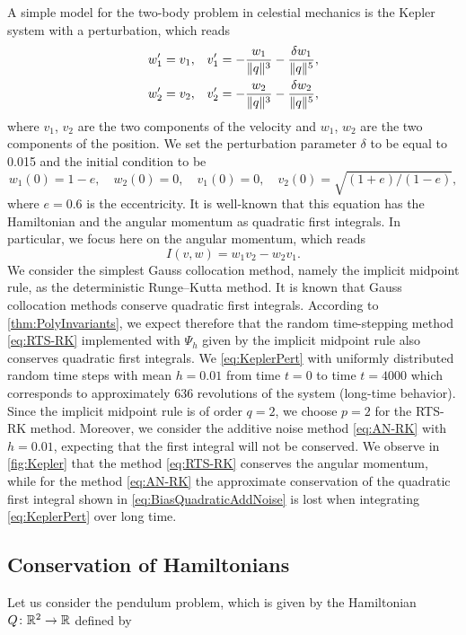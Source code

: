 \documentclass[10pt]{article}
\begin{document}
A simple model for the two-body problem in celestial mechanics is the Kepler system with a perturbation, which reads
\begin{equation}\label{eq:KeplerPert}
\begin{aligned}
	w_1' &= v_1, && v_1' = -\frac{w_1}{\lVert q\rVert^3} - \frac{\delta w_1}{\lVert q\rVert^5}, \\
	w_2' &= v_2, && v_2' = -\frac{w_2}{\lVert q\rVert^3} - \frac{\delta w_2}{\lVert q\rVert^5},
\end{aligned}
\end{equation}
where $v_1$, $v_2$ are the two components of the velocity and $w_1$, $w_2$ are the two components of the position. We set the perturbation parameter $\delta$ to be equal to 0.015 and the initial condition to be
\begin{equation}
	w_1(0) = 1 - e,\quad w_2(0) = 0, \quad v_1(0) = 0, \quad v_2(0) = \sqrt{(1 + e)/(1 − e)},
\end{equation}
where $e = 0.6$ is the eccentricity. It is well-known that this equation has the Hamiltonian and the angular momentum as quadratic first integrals. In particular, we focus here on the angular momentum, which reads
\begin{equation}\label{eq:AngularMomentum}
	I(v, w) = w_1v_2 - w_2v_1.
\end{equation}
We consider the simplest Gauss collocation method, namely the implicit midpoint rule, as the deterministic Runge--Kutta method. It is known that Gauss collocation methods conserve quadratic first integrals. According to \cref{thm:PolyInvariants}, we expect therefore that the random time-stepping method \eqref{eq:RTS-RK} implemented with $\Psi_h$ given by the implicit midpoint rule also conserves quadratic first integrals. We  \eqref{eq:KeplerPert} with uniformly distributed random time steps with mean $h = 0.01$ from time $t = 0$ to time $t = 4000$ which corresponds to approximately $636$ revolutions of the system (long-time behavior). Since the implicit midpoint rule is of order $q = 2$, we choose $p = 2$ for the RTS-RK method. Moreover, we consider the additive noise method \eqref{eq:AN-RK} with $h = 0.01$, expecting that the first integral will not be conserved. We observe in \cref{fig:Kepler} that the method \eqref{eq:RTS-RK} conserves the angular momentum, while for the method \eqref{eq:AN-RK} the approximate conservation of the quadratic first integral shown in \eqref{eq:BiasQuadraticAddNoise} is lost when integrating \eqref{eq:KeplerPert} over long time.

\subsection{Conservation of Hamiltonians} Let us consider the pendulum problem, which is given by the Hamiltonian $Q \colon \mathbb{R}^2 \to \mathbb{R}$ defined by
\end{document}
